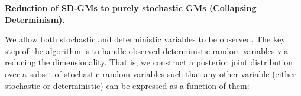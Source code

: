 \documentclass{article}
\newcommand{\tuple}[1] {\langle #1 \rangle}
\newcommand{\bvec}[1]{\textbf{#1}}
\newcommand{\pr}{p}
\begin{document}
\textbf{Reduction of SD-GMs to purely stochastic GMs (Collapsing Determinism).}

We allow both stochastic and deterministic variables to be observed.  
The key step of the algorithm is to handle observed deterministic random variables via reducing the dimensionality. 
That is, 
we construct a posterior joint distribution over a subset of stochastic random variables such that any other variable (either stochastic or deterministic)
can be expressed as a function of them:
\end{document}
